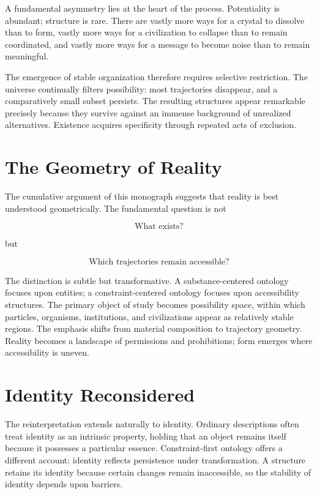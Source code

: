\documentclass[11pt,oneside]{book}
\theoremstyle{plain}
\theoremstyle{definition}
\theoremstyle{remark}
\begin{document}
A fundamental asymmetry lies at the heart of the process. Potentiality is abundant; structure is rare. There are vastly more ways for a crystal to dissolve than to form, vastly more ways for a civilization to collapse than to remain coordinated, and vastly more ways for a message to become noise than to remain meaningful.

The emergence of stable organization therefore requires selective restriction. The universe continually filters possibility: most trajectories disappear, and a comparatively small subset persists. The resulting structures appear remarkable precisely because they survive against an immense background of unrealized alternatives. Existence acquires specificity through repeated acts of exclusion.

\section{The Geometry of Reality}

The cumulative argument of this monograph suggests that reality is best understood geometrically. The fundamental question is not

\begin{equation}
\text{What exists?}
\end{equation}

but

\begin{equation}
\text{Which trajectories remain accessible?}
\end{equation}

The distinction is subtle but transformative. A substance-centered ontology focuses upon entities; a constraint-centered ontology focuses upon accessibility structures. The primary object of study becomes possibility space, within which particles, organisms, institutions, and civilizations appear as relatively stable regions. The emphasis shifts from material composition to trajectory geometry. Reality becomes a landscape of permissions and prohibitions; form emerges where accessibility is uneven.

\section{Identity Reconsidered}

The reinterpretation extends naturally to identity. Ordinary descriptions often treat identity as an intrinsic property, holding that an object remains itself because it possesses a particular essence. Constraint-first ontology offers a different account: identity reflects persistence under transformation. A structure retains its identity because certain changes remain inaccessible, so the stability of identity depends upon barriers.
\end{document}
